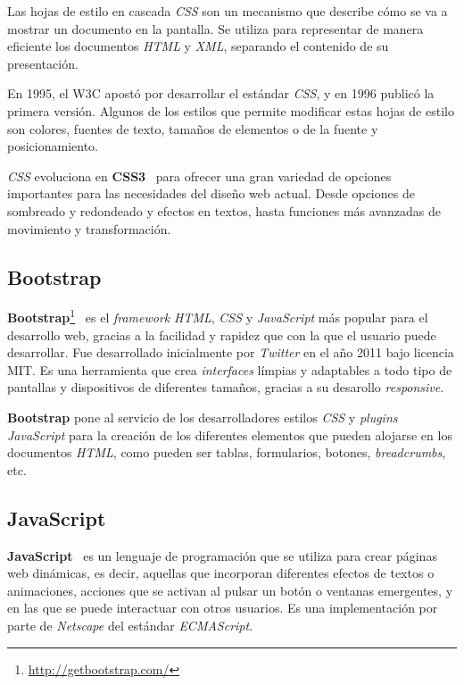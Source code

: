 \documentclass[a4paper, 12pt]{book}
\begin{document}
Las hojas de estilo en cascada \textit{CSS} son un mecanismo que describe cómo se va a mostrar un documento en la pantalla. Se utiliza para representar de manera eficiente los documentos \textit{HTML} y \textit{XML}, separando el contenido de su presentación.
\newline

En 1995, el W3C apostó por desarrollar el estándar \textit{CSS}, y en 1996 publicó la primera versión. Algunos de los estilos que permite modificar estas hojas de estilo son colores, fuentes de texto, tamaños de elementos o de la fuente y posicionamiento.
\newline

\textit{CSS} evoluciona en \textbf{CSS3}~\cite{pagina-css3} para ofrecer una gran variedad de opciones importantes para las necesidades del diseño web actual. Desde opciones de sombreado y redondeado y efectos en textos, hasta funciones más avanzadas de movimiento y transformación. 


\subsection{Bootstrap} 
\label{subsec:bootstrap}

\textbf{Bootstrap}\footnote{\url{http://getbootstrap.com/}}~\cite{pagina-bootstrap} es el \textit{framework} \textit{HTML}, \textit{CSS} y \textit{JavaScript} más popular para el desarrollo web, gracias a la facilidad y rapidez que con la que el usuario puede desarrollar. Fue desarrollado inicialmente por \textit{Twitter} en el año 2011 bajo licencia MIT. Es una herramienta que crea \textit{interfaces} límpias y adaptables a todo tipo de pantallas y dispositivos de diferentes tamaños, gracias a su desarollo \textit{responsive}.
\newline

\textbf{Bootstrap} pone al servicio de los desarrolladores estilos \textit{CSS} y \textit{plugins} \textit{JavaScript} para la creación de los diferentes elementos que pueden alojarse en los documentos \textit{HTML}, como pueden ser tablas, formularios, botones, \textit{breadcrumbs}, etc.

\subsection{JavaScript} 
\label{subsec:javascript}

\textbf{JavaScript}~\cite{pagina-javascript} es un lenguaje de programación que se utiliza para crear páginas web dinámicas, es decir, aquellas que incorporan diferentes efectos de textos o animaciones, acciones que se activan al pulsar un botón o ventanas emergentes, y en las que se puede interactuar con otros usuarios.  Es una implementación por parte de \textit{Netscape} del estándar \textit{ECMAScript}.
\newline
\end{document}
